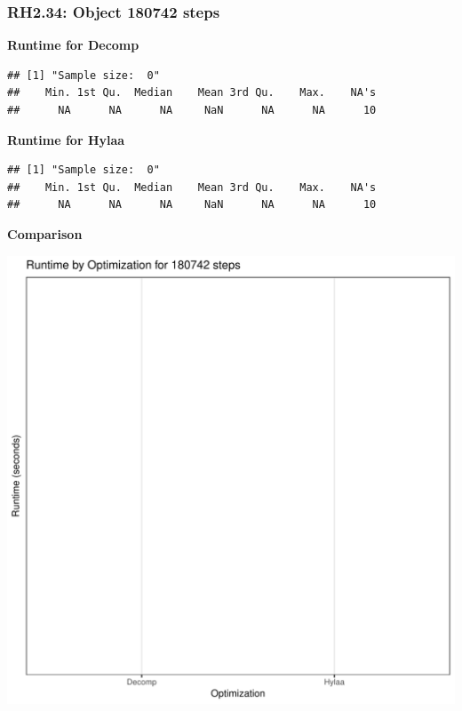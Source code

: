 \documentclass{article}\usepackage[]{graphicx}\usepackage[]{color}
\makeatletter
\def\maxwidth{ %
  \ifdim\Gin@nat@width>\linewidth
    \linewidth
  \else
    \Gin@nat@width
  \fi
}
\newenvironment{kframe}{%
 \def\at@end@of@kframe{}%
 \ifinner\ifhmode%
  \def\at@end@of@kframe{\end{minipage}}%
  \begin{minipage}{\columnwidth}%
 \fi\fi%
 \def\FrameCommand##1{\hskip\@totalleftmargin \hskip-\fboxsep
 \colorbox{shadecolor}{##1}\hskip-\fboxsep
     \hskip-\linewidth \hskip-\@totalleftmargin \hskip\columnwidth}%
 \MakeFramed {\advance\hsize-\width
   \@totalleftmargin\z@ \linewidth\hsize
   \@setminipage}}%
 {\par\unskip\endMakeFramed%
 \at@end@of@kframe}
\newenvironment{knitrout}{}{} %
\makeatother
\begin{document}
\subsubsection{RH2.34: Object 180742 steps}

 \textbf{Runtime for Decomp}
\begin{knitrout}
\color{fgcolor}\begin{kframe}
\begin{verbatim}
## [1] "Sample size:  0"
##    Min. 1st Qu.  Median    Mean 3rd Qu.    Max.    NA's 
##      NA      NA      NA     NaN      NA      NA      10
\end{verbatim}
\end{kframe}
\end{knitrout}
 \textbf{Runtime for Hylaa}
\begin{knitrout}
\color{fgcolor}\begin{kframe}
\begin{verbatim}
## [1] "Sample size:  0"
##    Min. 1st Qu.  Median    Mean 3rd Qu.    Max.    NA's 
##      NA      NA      NA     NaN      NA      NA      10
\end{verbatim}
\end{kframe}
\end{knitrout}
  
 \textbf{Comparison}
  
\begin{knitrout}
\color{fgcolor}
\includegraphics[width=\maxwidth]{figure/RH2_steps180742-1} 

\end{knitrout}
\end{document}
